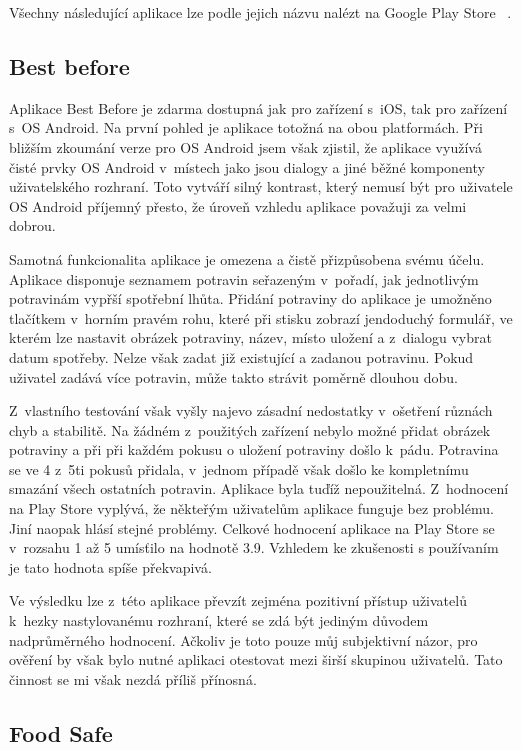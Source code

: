 \documentclass[thesis=B,czech]{FITthesis}[2013/10/20]
\begin{document}
Všechny následující aplikace lze podle jejich názvu nalézt na Google Play Store ~\cite{play_store}.

\subsection{Best before}

Aplikace Best Before je zdarma dostupná jak pro zařízení s~iOS, tak pro zařízení s~OS Android. Na první pohled je aplikace totožná na obou platformách. Při bližším zkoumání verze pro OS Android jsem však zjistil, že aplikace využívá čisté prvky OS Android v~místech jako jsou dialogy a jiné běžné komponenty uživatelského rozhraní. Toto vytváří silný kontrast, který nemusí být pro uživatele OS Android příjemný přesto, že úroveň vzhledu aplikace považuji za velmi dobrou.

Samotná funkcionalita aplikace je omezena a čistě přizpůsobena svému účelu. Aplikace disponuje seznamem potravin seřazeným v~pořadí, jak jednotlivým potravinám vypřší spotřební lhůta. Přidání potraviny do aplikace je umožněno tlačítkem v~horním pravém rohu, které při stisku zobrazí jendoduchý formulář, ve kterém lze nastavit obrázek potraviny, název, místo uložení a z~dialogu vybrat datum spotřeby. Nelze však zadat již existující a zadanou potravinu. Pokud uživatel zadává více potravin, může takto strávit poměrně dlouhou dobu.

Z~vlastního testování však vyšly najevo zásadní nedostatky v~ošetření různách chyb a stabilitě. Na žádném z~použitých zařízení nebylo možné přidat obrázek potraviny a při při každém pokusu o uložení potraviny došlo k~pádu. Potravina se ve 4 z~5ti pokusů přidala, v~jednom případě však došlo ke kompletnímu smazání všech ostatních potravin. Aplikace byla tuďíž nepoužitelná. Z~hodnocení na Play Store vyplývá, že někteřým uživatelům aplikace funguje bez problému. Jiní naopak hlásí stejné problémy. Celkové hodnocení aplikace na Play Store se v~rozsahu 1 až 5 umísťilo na hodnotě 3.9. Vzhledem ke zkušenosti s používaním je tato hodnota spíše překvapivá.

Ve výsledku lze z~této aplikace převzít zejména pozitivní přístup uživatelů k~hezky nastylovanému rozhraní, které se zdá být jediným důvodem nadprůměrného hodnocení. Ačkoliv je toto pouze můj subjektivní názor, pro ověření by však bylo nutné aplikaci otestovat mezi širší skupinou uživatelů. Tato činnost se mi však nezdá příliš přínosná.

\subsection{Food Safe}
\end{document}
